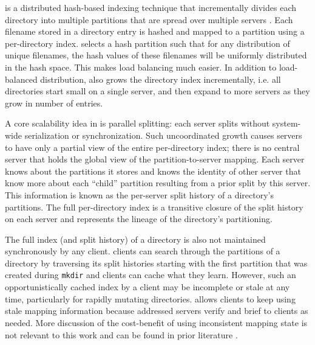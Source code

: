 \giga is a distributed hash-based indexing technique that incrementally
divides each directory into multiple partitions that are spread over multiple
servers \cite{GIGA11}.
Each filename stored in a directory entry is hashed and mapped to a partition
using a per-directory index.
\giga selects a hash partition such that for any distribution of unique filenames,
the hash values of these filenames will be uniformly distributed in the hash space.
This makes load balancing much easier.
In addition to load-balanced distribution, \giga also grows the directory
index incrementally, i.e. all directories start small on a single server, and
then expand to more servers as they grow in number of entries.

A core scalability idea in \giga is parallel splitting: each server splits
without system-wide serialization or synchronization.
Such uncoordinated growth causes \giga servers to have only a partial view of
the entire per-directory index;
there is no central server that holds the global view of the
partition-to-server mapping.
Each server knows about the partitions it stores and knows the
identity of other server that know more about each ``child'' partition
resulting from a prior split by this server.
This information is known as the per-server split history of
a directory's partitions.
The full per-directory \giga index is
a transitive closure of the split history on each
server and represents the lineage of the directory's partitioning.

The full index (and split history) of a directory
is also not maintained synchronously by any client.
\giga clients can search through the partitions of a directory by traversing
its split histories starting with the first partition that was created during
\texttt{mkdir} and clients can cache what they learn.
However, such an opportunistically cached index by a client may be
incomplete or stale at any time, particularly for rapidly mutating directories.
\giga allows clients to keep using stale mapping information
because addressed servers verify and brief to clients as needed.
More discussion of the cost-benefit of using
inconsistent mapping state is not relevant to this work and can be found in
prior \giga{} literature \cite{GIGA07, GIGA11}.

